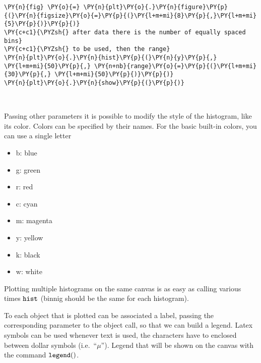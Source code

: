     \begin{tcolorbox}[breakable, size=fbox, boxrule=1pt, pad at break*=1mm,colback=cellbackground, colframe=cellborder]
\begin{Verbatim}[commandchars=\\\{\}]
\PY{n}{fig} \PY{o}{=} \PY{n}{plt}\PY{o}{.}\PY{n}{figure}\PY{p}{(}\PY{n}{figsize}\PY{o}{=}\PY{p}{(}\PY{l+m+mi}{8}\PY{p}{,}\PY{l+m+mi}{5}\PY{p}{)}\PY{p}{)}
\PY{c+c1}{\PYZsh{} after data there is the number of equally spaced bins}
\PY{c+c1}{\PYZsh{} to be used, then the range}
\PY{n}{plt}\PY{o}{.}\PY{n}{hist}\PY{p}{(}\PY{n}{y}\PY{p}{,} \PY{l+m+mi}{50}\PY{p}{,} \PY{n+nb}{range}\PY{o}{=}\PY{p}{(}\PY{l+m+mi}{30}\PY{p}{,} \PY{l+m+mi}{50}\PY{p}{)}\PY{p}{)}
\PY{n}{plt}\PY{o}{.}\PY{n}{show}\PY{p}{(}\PY{p}{)}
\end{Verbatim}
\end{tcolorbox}

    \begin{center}
    \end{center}
    { \hspace*{\fill} \\}
    
    Passing other parameters it is possible to modify the style of the
histogram, like its color. Colors can be specified by their names. For
the basic built-in colors, you can use a single letter

\begin{itemize}
\tightlist
\item
  b: blue
\item
  g: green
\item
  r: red
\item
  c: cyan
\item
  m: magenta
\item
  y: yellow
\item
  k: black
\item
  w: white
\end{itemize}

Plotting multiple histograms on the same canvas is as easy as calling
various times \(\tt{hist}\) (binnig should be the same for each
histogram).

To each object that is plotted can be associated a label, passing the
corresponding parameter to the object call, so that we can build a
legend. Latex symbols can be used whenever text is used, the characters
have to enclosed between dollar symbols (i.e.~``\(\mu\)''). Legend that
will be shown on the canvas with the command \(\tt{legend()}\).

